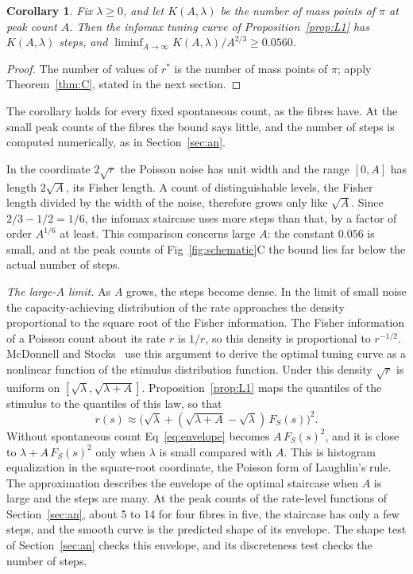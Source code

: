 \documentclass[10pt,letterpaper]{article}
\newtheorem{corollary}[theorem]{Corollary}
\begin{document}
\begin{corollary}\label{cor:L2}
Fix $\lambda\ge0$, and let $K(A,\lambda)$ be the number of mass points of $\pi$ at peak count $A$. Then the infomax tuning curve of
Proposition~\ref{prop:L1} has $K(A,\lambda)$ steps, and $\liminf_{A\to\infty}K(A,\lambda)/A^{2/3}\ge 0.0560$.
\end{corollary}
\begin{proof}
The number of values of $r^*$ is the number of mass points of $\pi$; apply Theorem~\ref{thm:C}, stated in the next section.
\end{proof}

The corollary holds for every fixed spontaneous count, as the fibres have. At the small peak counts of the fibres the bound says
little, and the number of steps is computed numerically, as in Section~\ref{sec:an}.

In the coordinate $2\sqrt r$ the Poisson noise has unit width and the range $[0,A]$ has length $2\sqrt A$, its Fisher length. A count
of distinguishable levels, the Fisher length divided by the width of the noise, therefore grows only like $\sqrt A$. Since
$2/3-1/2=1/6$, the infomax staircase uses more steps than that, by a factor of order $A^{1/6}$ at least. This comparison concerns
large $A$: the constant $0.056$ is small, and at the peak counts of Fig~\ref{fig:schematic}C the bound lies far below the actual
number of steps.

\emph{The large-$A$ limit.} As $A$ grows, the steps become dense. In the limit of small noise the capacity-achieving distribution of
the rate approaches the density proportional to the square root of the Fisher information. The Fisher information of a Poisson
count about its rate $r$ is $1/r$, so this density is proportional to $r^{-1/2}$. McDonnell and Stocks~\cite{McDonnellStocks2008} use this argument to derive the optimal tuning curve as a
nonlinear function of the stimulus distribution function. Under this density $\sqrt r$ is uniform on $[\sqrt\lambda,\sqrt{\lambda+A}]$.
Proposition~\ref{prop:L1} maps the quantiles of the stimulus to the quantiles of this law, so that
\begin{equation}
r(s)\approx\bigl(\sqrt\lambda+(\sqrt{\lambda+A}-\sqrt\lambda)\,F_S(s)\bigr)^2 .\label{eq:envelope}
\end{equation}
Without spontaneous count Eq~\eqref{eq:envelope} becomes $A\,F_S(s)^2$, and it is close to $\lambda+A\,F_S(s)^2$ only when $\lambda$ is small compared with
$A$. This is histogram equalization in the square-root coordinate, the Poisson form of Laughlin's rule. The approximation describes the
envelope of the optimal staircase when $A$ is large and the steps are many. At the peak counts of the rate-level functions of Section~\ref{sec:an},
about 5 to 14 for four fibres in five, the staircase has only a few steps, and the smooth curve is the predicted shape of its envelope. The shape test of Section~\ref{sec:an} checks this envelope, and its
discreteness test checks the number of steps.
\end{document}
